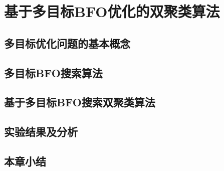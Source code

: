 \chapter{基于多目标BFO优化的双聚类算法}

\section{多目标优化问题的基本概念}

\section{多目标BFO搜索算法}

\section{基于多目标BFO搜索双聚类算法}

\section{实验结果及分析}

\section{本章小结}